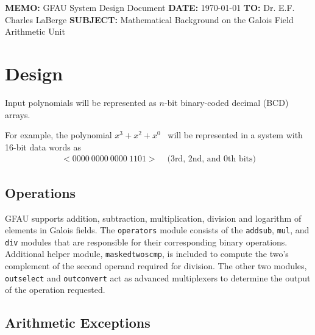\documentclass[11pt]{extarticle}
\newcommand{\examplepoly}{$x^{3}+x^{2}+x^{0}$}
\begin{document}
    \documentinfo
    {\textbf{MEMO:} GFAU System Design Document}
    {\textbf{DATE:} \today}
    {\textbf{TO:} Dr. E.F. Charles LaBerge}
    {\textbf{SUBJECT: } Mathematical Background on the Galois Field Arithmetic
    Unit}
    \vspace{-0.1in}

    

    \section{Design} Input polynomials will be represented as $n$-bit
    binary-coded decimal (BCD) arrays.

    For example, the polynomial \examplepoly~ will be represented in a system
    with 16-bit data words as
        \begin{equation*}
            \begin{split}
                <0000 \ 0000 \ 0000 \ 1101> & \text{  (3rd, 2nd, and 0th bits)}
            \end{split}
        \end{equation*}

        

        
        \subsection{Operations} GFAU supports addition, subtraction,
        multiplication, division and logarithm of elements in Galois fields.
        The \texttt{operators} module consists of the \texttt{addsub},
        \texttt{mul}, and \texttt{div} modules that are responsible for their
        corresponding binary operations. Additional helper module,
        \texttt{maskedtwoscmp}, is included to compute the two's complement of
        the second operand required for division. The other two modules,
        \texttt{outselect} and \texttt{outconvert} act as advanced multiplexers
        to determine the output of the operation requested.

        
        
        
        

        \subsection{Arithmetic Exceptions}
\end{document}

